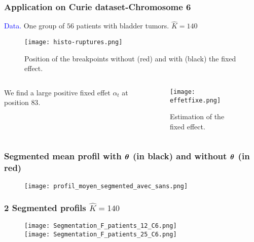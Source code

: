 \documentclass[compress]{beamer}
\newcommand{\thetabf}{\text{\mathversion{bold}{$\theta$}}}
\begin{document}
\begin{frame}
\frametitle{Application on Curie dataset-Chromosome 6}
\textcolor{blue}{Data.} One group of $56$ patients with bladder tumors.
$\hat K=140$

 \begin{figure}
  \texttt{[image: histo-ruptures.png]}
 \caption{Position of the breakpoints without (red) and with (black) the fixed effect.}
  \end{figure}

\end{frame}
\begin{frame}
\begin{columns}
\begin{column}{3cm}
We find a large positive fixed effet $\alpha_t$ at position $83$. 
\end{column}
\begin{column}{8cm}
\begin{figure}
  \texttt{[image: effetfixe.png]}
 \caption{Estimation of the fixed effect.}
  \end{figure}
\end{column}
\end{columns}
\end{frame}

\begin{frame}
\frametitle{Segmented mean profil with $\thetabf$ (in black) and without $\thetabf$ (in red)}
\begin{figure}
\begin{center}
\texttt{[image: profil\_moyen\_segmented\_avec\_sans.png]}
\end{center}
\end{figure}
\end{frame}

\begin{frame}
\frametitle{2 Segmented profils $\hat K=140$ }
\begin{figure}
\texttt{[image: Segmentation\_F\_patients\_12\_C6.png]}\\
\texttt{[image: Segmentation\_F\_patients\_25\_C6.png]}
\end{figure}
\end{frame}
\end{document}
